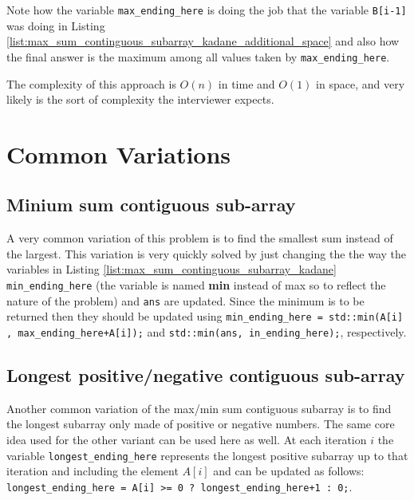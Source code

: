 

Note how the variable \texttt{max\_ending\_here} is doing the job that the variable \texttt{B[i-1]}
was doing in Listing \ref{list:max_sum_continguous_subarray_kadane_additional_space} and also how
the final answer is the maximum among all values taken by \texttt{max\_ending\_here}.

The complexity of this approach is $O(n)$ in time and $O(1)$ in space, and very likely is the sort
of complexity the interviewer expects.

\section{Common Variations}
\subsection{Minium sum contiguous sub-array}
A very common variation of this problem is to find the smallest sum instead of the largest. This
variation is very quickly solved by just changing the the way the variables in Listing \ref{list:max_sum_continguous_subarray_kadane}
\texttt{min\_ending\_here} (the variable is named \textbf{min} instead of max so to reflect the nature of the
problem) and \texttt{ans} are updated. Since the minimum is to be returned then they should be
updated using \lstinline[columns=fixed]{min_ending_here = std::min(A[i] , max_ending_here+A[i]);}
and \lstinline[columns=fixed]{std::min(ans, in_ending_here);}, respectively.  

\subsection{Longest positive/negative contiguous sub-array}
Another common variation of the max/min sum contiguous subarray is to find the longest subarray only
made of positive or negative numbers. The same core idea used for the other variant can be used here
as well. At each iteration $i$ the variable \texttt{longest\_ending\_here} represents the longest
positive subarray up to that iteration and including the element $A[i]$ and can be updated as
follows: \lstinline[columns=fixed]{longest_ending_here = A[i] >= 0 ? longest_ending_here+1 : 0;}.